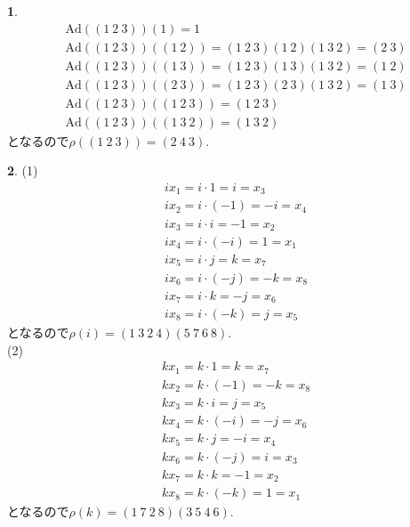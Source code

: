 \documentclass{article}
\theoremstyle{definition}
\newtheorem{ans}{}
\numberwithin{ans}{subsection}
\newcommand{\Ad}[1]{\mathrm{Ad}(#1)}
\begin{document}
\begin{ans}
  \begin{align*}
    &\Ad{(1\ 2\ 3)}(1) = 1\\
    &\Ad{(1\ 2\ 3)}((1\ 2)) = (1\ 2\ 3)(1\ 2)(1\ 3\ 2) = (2\ 3)\\
    &\Ad{(1\ 2\ 3)}((1\ 3)) = (1\ 2\ 3)(1\ 3)(1\ 3\ 2) = (1\ 2)\\
    &\Ad{(1\ 2\ 3)}((2\ 3)) = (1\ 2\ 3)(2\ 3)(1\ 3\ 2) = (1\ 3)\\
    &\Ad{(1\ 2\ 3)}((1\ 2\ 3)) = (1\ 2\ 3)\\
    &\Ad{(1\ 2\ 3)}((1\ 3\ 2)) = (1\ 3\ 2)
  \end{align*}
  となるので$\rho((1\ 2\ 3)) = (2\ 4\ 3)$.
\end{ans}

\begin{ans}
  (1)
  \begin{align*}
    &ix_1 = i \cdot 1 = i = x_3\\
    &ix_2 = i \cdot (-1) = -i = x_4\\
    &ix_3 = i \cdot i = -1 = x_2\\
    &ix_4 = i \cdot (-i) = 1 = x_1\\
    &ix_5 = i \cdot j = k = x_7\\
    &ix_6 = i \cdot (-j) = -k = x_8\\
    &ix_7 = i \cdot k = -j = x_6\\
    &ix_8 = i \cdot (-k) = j = x_5
  \end{align*}
  となるので$\rho(i) = (1\ 3\ 2\ 4)(5\ 7\ 6\ 8)$.\\
  (2)
  \begin{align*}
    &kx_1 = k \cdot 1 = k = x_7\\
    &kx_2 = k \cdot (-1) = -k = x_8\\
    &kx_3 = k \cdot i = j = x_5\\
    &kx_4 = k \cdot (-i) = -j = x_6\\
    &kx_5 = k \cdot j = -i = x_4\\
    &kx_6 = k \cdot (-j) = i = x_3\\
    &kx_7 = k \cdot k = -1 = x_2\\
    &kx_8 = k \cdot (-k) = 1 = x_1
  \end{align*}
  となるので$\rho(k) = (1\ 7\ 2\ 8)(3\ 5\ 4\ 6)$.
\end{ans}
\end{document}
